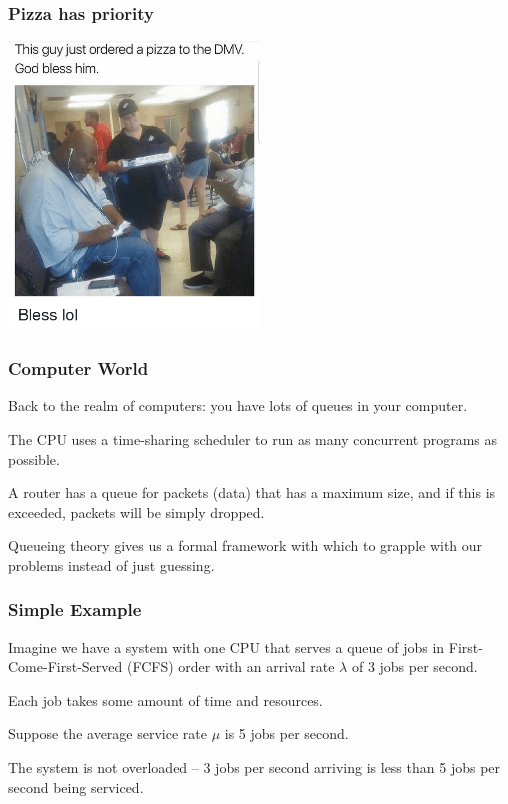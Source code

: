 \begin{frame}
\frametitle{Pizza has priority}

\begin{center}
	\includegraphics[width=0.5\textwidth]{images/dmv.png}
\end{center}

\end{frame}



\begin{frame}
\frametitle{Computer World}

Back to the realm of computers: you have lots of queues in your computer. 

The CPU uses a time-sharing scheduler to run as many concurrent programs as possible. 

A router has a queue for packets (data) that has a maximum size, and if this is exceeded, packets will be simply dropped. 

Queueing theory gives us a formal framework with which to grapple with our problems instead of just guessing.


\end{frame}



\begin{frame}
\frametitle{Simple Example}

Imagine we have a system with one CPU that serves a queue of jobs in First-Come-First-Served (FCFS) order with an arrival rate $\lambda$ of 3 jobs per second. 

Each job takes some amount of time and resources. 

Suppose the average service rate $\mu$ is 5 jobs per second. 

The system is not overloaded -- 3 jobs per second arriving is less than 5 jobs per second being serviced. 

\end{frame}



